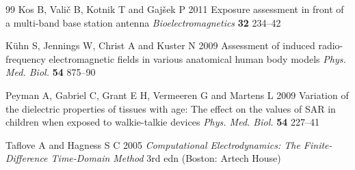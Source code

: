 \documentclass{iopjournal}
\begin{document}
\begin{thebibliography}{99}
Kos B, Vali\v{c} B, Kotnik T and Gaj\v{s}ek P 2011 Exposure assessment in front of a multi-band base station antenna \emph{Bioelectromagnetics} \textbf{32} 234--42

K{\"u}hn S, Jennings W, Christ A and Kuster N 2009 Assessment of induced radio-frequency electromagnetic fields in various anatomical human body models \emph{Phys. Med. Biol.} \textbf{54} 875--90

Peyman A, Gabriel C, Grant E H, Vermeeren G and Martens L 2009 Variation of the dielectric properties of tissues with age: The effect on the values of SAR in children when exposed to walkie-talkie devices \emph{Phys. Med. Biol.} \textbf{54} 227--41

Taflove A and Hagness S C 2005 \emph{Computational Electrodynamics: The Finite-Difference Time-Domain Method} 3rd edn (Boston: Artech House)

\end{thebibliography}
\end{document}
